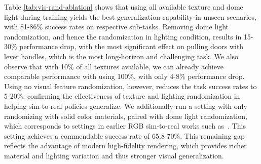 Table \ref{tab:vis-rand-ablation} shows that using all available texture and dome light during training yields the best generalization capability in unseen scenarios, with 81-86\% success rates on respective sub-tasks. Removing dome light randomization, and hence the randomization in lighting condition, results in 15-30\% performance drop, with the most significant effect on pulling doors with lever handles, which is the most long-horizon and challenging task. We also observe that with 10\% of all textures available, we can already achieve comparable performance with using 100\%, with only 4-8\% performance drop. Using no visual feature randomization, however, reduces the task success rates to 5-20\%, confirming the effectiveness of texture and lighting randomization in helping sim-to-real policies generalize. We additionally run a setting with only randomizing with solid color materials, paired with dome light randomization, which corresponds to settings in earlier RGB sim-to-real works such as~\citet{tobin2017domain,zhu2018reinforcement}. This setting achieves a commendable success rate of 65.8-70\%. This remaining gap reflects the advantage of modern high-fidelity rendering, which provides richer material and lighting variation and thus stronger visual generalization.


